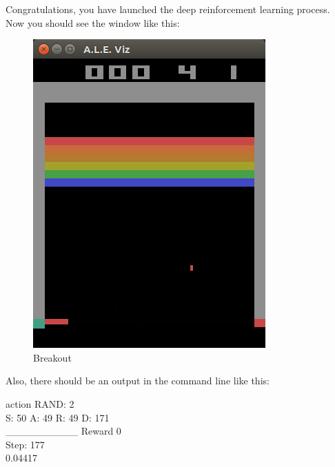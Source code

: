 \documentclass[a4paper,oneside,dvipsnames]{article}
\begin{document}
Congratulations, you have launched the deep reinforcement learning process. \\
Now you should see the window like this:
\begin{figure}[h]
    \centering
    \includegraphics[scale=0.53]{breakout.png}
    \caption{Breakout}
    \label{fig:theGame}
\end{figure}

Also, there should be an output in the command line like this:
\begin{tcolorbox}[colbacktitle=gray!40!white, coltitle=black, width=\linewidth, fonttitle=\bfseries, title=Output]
action RAND: 2 \\
S: 50 A: 49 R: 49 D: 171 \\
\_\_\_\_\_\_\_\_\_\_ Reward  0 \\
Step: 177 \\
0.04417 
\end{tcolorbox}
\end{document}
